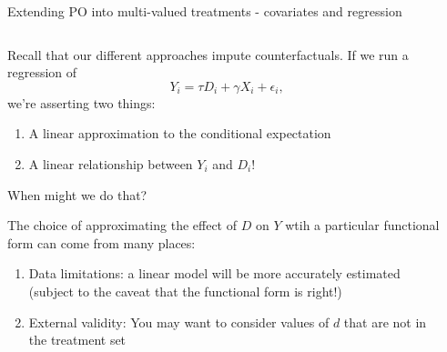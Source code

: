 \documentclass[notes,11pt, aspectratio=169]{beamer}
\newenvironment{wideitemize}{\itemize\addtolength{\itemsep}{10pt}}{\enditemize}
\begin{document}
\begin{frame}{Extending PO into multi-valued treatments - covariates and regression}
\begin{columns}[T] %
  \begin{column}{.7\textwidth}
  \begin{wideitemize}
  \item Recall that our different approaches impute counterfactuals.  If we run a regression of
    \begin{equation*}
      Y_{i} = \tau D_{i} + \gamma X_{i} + \epsilon_{i},
    \end{equation*}
    we're asserting two things:
    \begin{enumerate}
    \item A linear approximation to the conditional expectation
    \item A linear relationship between $Y_{i}$ and $D_{i}$!
    \end{enumerate}
    When might we do that?
    \vspace{-7pt}
  \item The choice of approximating the effect of $D$ on $Y$ wtih a particular functional form can come from many places:
    \begin{enumerate}
    \item Data limitations: a linear model will be more accurately estimated (subject to the caveat that the functional form is right!)
    \item External validity: You may want to consider values of $d$
      that are not in the treatment set
    \end{enumerate}
\end{wideitemize}    


\end{column}%
  \hfill%
  \begin{column}{.4\textwidth}
  \end{column}
\end{columns}
\end{frame}
\end{document}
